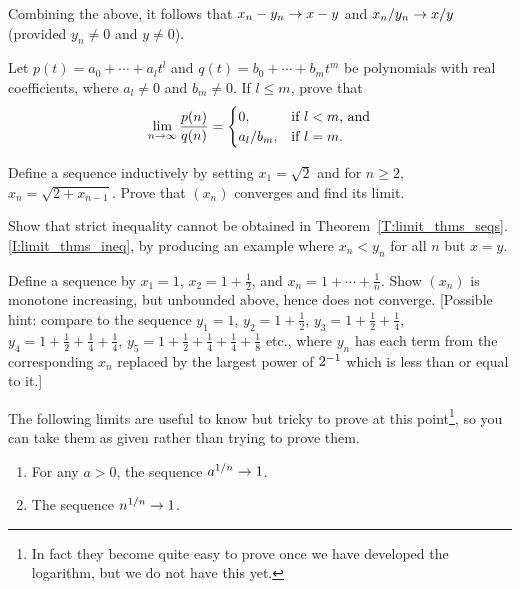 \documentclass{book}
\begin{document}
\begin{rmk}
Combining the above, it follows that $x_n - y_n \rightarrow x - y$ and $x_n/y_n \rightarrow x/y$ (provided $y_n \neq 0$ and $y \neq 0$).
\end{rmk}

\begin{prob}
Let $p(t) = a_0 + \cdots + a_l t^l$ and $q(t) = b_0 + \cdots + b_m t^m$ be
polynomials with real coefficients, where $a_l \neq 0$ and $b_m \neq 0$. If $l \leq m$, prove that
\[
	\lim_{n\rightarrow \infty} \frac{p(n)}{q(n)} = 
	\begin{cases} 0, & \text{if $l < m$, and} 
	\\ a_l/b_m, & \text{if $l = m$.} 
	\end{cases}
\]
\label{Pr:rational_limit}
\end{prob}

\begin{prob}
Define a sequence inductively by setting $x_1 = \sqrt 2$ and for $n \geq 2$, $x_n = \sqrt{2 + x_{n-1}}$. Prove 
that $(x_n)$ converges and find its limit.
\label{Pr:inductive_sequence}
\end{prob}

\begin{exstar}
Show that strict inequality cannot be obtained in Theorem~\ref{T:limit_thms_seqs}.\eqref{I:limit_thms_ineq}, by producing an example where $x_n < y_n$ for all $n$ but $x = y$.
\label{Ex:strict_limit_ineq}
\end{exstar}

\begin{exstar}
Define a sequence by $x_1 = 1$, $x_2 = 1 + \frac 1 2$, and $x_n = 1 + \cdots + \frac 1 n$. Show $(x_n)$ is monotone increasing, but unbounded above, hence
does not converge. [Possible hint: compare to the sequence $y_1 = 1$, $y_2 = 1 + \frac 1 2$, $y_3 = 1 + \frac 1 2 + \frac 1 4$, $y_4 = 1 + \frac 1 2 + \frac 1 4 + \frac 1 4$,
$y_5 = 1 + \frac 1 2 + \frac 1 4 + \frac 1 4 + \frac 1 8$
etc., where $y_n$ has each term from the corresponding $x_n$ replaced by the largest power of $2^{-1}$ which is less than or equal to it.]
\label{Ex:harmonic}
\end{exstar}

The following limits are useful to know but tricky to prove at this
point\footnote{In fact they become quite easy to prove once we have developed
the logarithm, but we do not have this yet.}, so you can take them as given
rather than trying to prove them.
\begin{propdag}
\mbox{}
\begin{enumerate}
\item For any $a > 0$, the sequence $a^{1/n} \rightarrow 1$.
\item The sequence $n^{1/n} \rightarrow 1$. 
\end{enumerate}
\label{P:nthrootseq}
\end{propdag}
\end{document}
